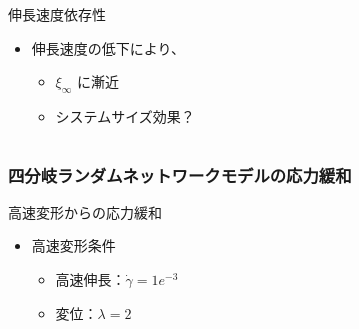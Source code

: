 \documentclass[11pt, dvipdfmx]{beamer}
\begin{document}
\begin{frame}
\begin{columns}[totalwidth=\linewidth]
\begin{block}{伸長速度依存性}
	\begin{itemize}
	\item
	伸長速度の低下により、
		\begin{itemize}
		\item
		$\xi_{\infty}$ に漸近
		\item
		システムサイズ効果？
		\end{itemize}
	\end{itemize}
\end{block}

\end{columns}

\end{frame}

\begin{frame}
\frametitle{四分岐ランダムネットワークモデルの応力緩和}
\small

\begin{exampleblock}{高速変形からの応力緩和}
	\begin{itemize}
	\item
	高速変形条件
		\begin{itemize}
		\item
		高速伸長：$\dot{\gamma} = 1e^{-3}$
		\item
		変位：$\lambda = 2$
		\end{itemize}
	\end{itemize}
\end{exampleblock}


\end{frame}
\end{document}
